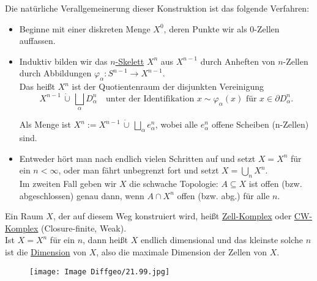 \documentclass[fleqn, 12pt, letterpaper]{article}
\begin{document}
Die natürliche Verallgemeinerung dieser Konstruktion ist das folgende Verfahren:
\begin{itemize}
    \item Beginne mit einer diskreten Menge \( X^0 \), deren Punkte wir als 0-Zellen auffassen.
    \item Induktiv bilden wir das \underline{\( n \)-Skelett} \( X^n \) aus \( X^{n-1} \) durch Anheften von \( n \)-Zellen durch Abbildungen $\varphi_\alpha: S^{n-1}\to X^{n-1}$.\\
    
    Das heißt \( X^n \) ist der Quotientenraum der disjunkten Vereinigung 
\[ X^{n-1} \,\dot{\cup}\, \bigsqcup_\alpha D^n_\alpha \quad \text{unter der Identifikation } x \sim \varphi_\alpha(x) \text{ für } x \in \partial D^n_\alpha. \]

Als Menge ist \( X^n :=  X^{n-1} \,\dot{\cup}\, \bigsqcup_\alpha e^n_\alpha \), wobei alle \( e^n_\alpha \) offene Scheiben (n-Zellen) sind.
\item Entweder hört man nach endlich vielen Schritten auf und setzt \( X = X^n \) für ein \( n < \infty \), 
oder man fährt unbegrenzt fort und setzt \( X = \bigcup_n X^n \).\\

Im zweiten Fall geben wir \( X \) die schwache Topologie: 
\( A \subseteq X \) ist offen (bzw. abgeschlossen) genau dann, wenn \( A \cap X^n \) offen (bzw. abg.) für alle \( n \).
\end{itemize}


Ein Raum \( X \), der auf diesem Weg konstruiert wird, heißt \underline{Zell-Komplex} oder \underline{CW-Komplex} (Closure-finite, Weak).\\

Ist \( X = X^n \) für ein \( n \), dann heißt \( X \) endlich dimensional und das kleinste solche \( n \) ist die \underline{Dimension} von \( X \),
also die maximale Dimension der Zellen von \( X \).
\begin{figure}[H]
    \centering
    \texttt{[image: Image Diffgeo/21.99.jpg]}
 \end{figure}
\end{document}
